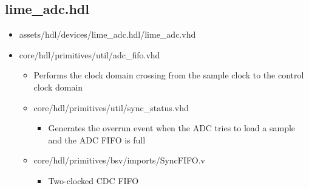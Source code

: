 \documentclass{article}
\def\comp{lime\_adc}
\begin{document}
\subsection*{\comp.hdl}
\begin{itemize}
	\item assets/hdl/devices/lime\_adc.hdl/lime\_adc.vhd
	\item core/hdl/primitives/util/adc\_fifo.vhd
    \begin{itemize}
    		\item Performs the clock domain crossing from the sample clock to the control clock domain
    \end{itemize}
	\begin{itemize}
		\item core/hdl/primitives/util/sync\_status.vhd
	    \begin{itemize}
    			\item Generates the overrun event when the ADC tries to load a	sample and the ADC FIFO is full
		\end{itemize}
		\item core/hdl/primitives/bsv/imports/SyncFIFO.v
    		\begin{itemize}
		    	\item Two-clocked CDC FIFO
	    \end{itemize}
	\end{itemize}

\end{itemize}
\end{document}
